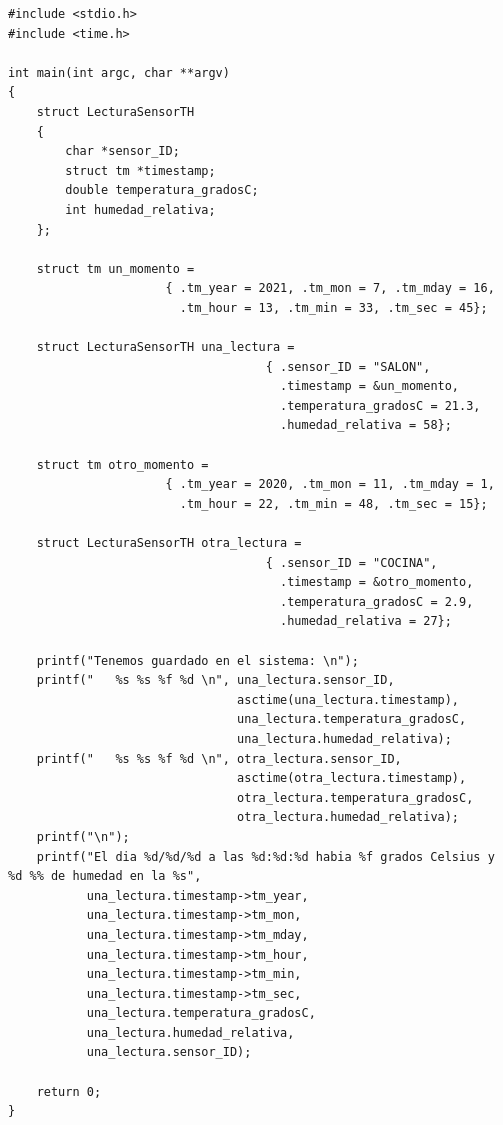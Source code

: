 \documentclass[spanish,12pt,a4paper,final,oneside]{book}
\begin{document}
\begin{lstlisting}[frame=single, caption=lenguaje C]
#include <stdio.h>
#include <time.h>

int main(int argc, char **argv)
{
    struct LecturaSensorTH
    {
        char *sensor_ID;
        struct tm *timestamp;
        double temperatura_gradosC;
        int humedad_relativa;
    };

    struct tm un_momento = 
                      { .tm_year = 2021, .tm_mon = 7, .tm_mday = 16,
                        .tm_hour = 13, .tm_min = 33, .tm_sec = 45};
                        
    struct LecturaSensorTH una_lectura =
                                    { .sensor_ID = "SALON",
                                      .timestamp = &un_momento,
                                      .temperatura_gradosC = 21.3,
                                      .humedad_relativa = 58};

    struct tm otro_momento = 
                      { .tm_year = 2020, .tm_mon = 11, .tm_mday = 1,
                        .tm_hour = 22, .tm_min = 48, .tm_sec = 15};

    struct LecturaSensorTH otra_lectura =
                                    { .sensor_ID = "COCINA",
                                      .timestamp = &otro_momento,
                                      .temperatura_gradosC = 2.9,
                                      .humedad_relativa = 27};

    printf("Tenemos guardado en el sistema: \n");
    printf("   %s %s %f %d \n", una_lectura.sensor_ID,
                                asctime(una_lectura.timestamp),
                                una_lectura.temperatura_gradosC,
                                una_lectura.humedad_relativa);
    printf("   %s %s %f %d \n", otra_lectura.sensor_ID,
                                asctime(otra_lectura.timestamp),
                                otra_lectura.temperatura_gradosC,
                                otra_lectura.humedad_relativa);
    printf("\n");
    printf("El dia %d/%d/%d a las %d:%d:%d habia %f grados Celsius y %d %% de humedad en la %s",
           una_lectura.timestamp->tm_year,
           una_lectura.timestamp->tm_mon,
           una_lectura.timestamp->tm_mday,
           una_lectura.timestamp->tm_hour,
           una_lectura.timestamp->tm_min,
           una_lectura.timestamp->tm_sec,
           una_lectura.temperatura_gradosC,
           una_lectura.humedad_relativa,
           una_lectura.sensor_ID);
    
    return 0;
}
\end{lstlisting}
\end{document}

